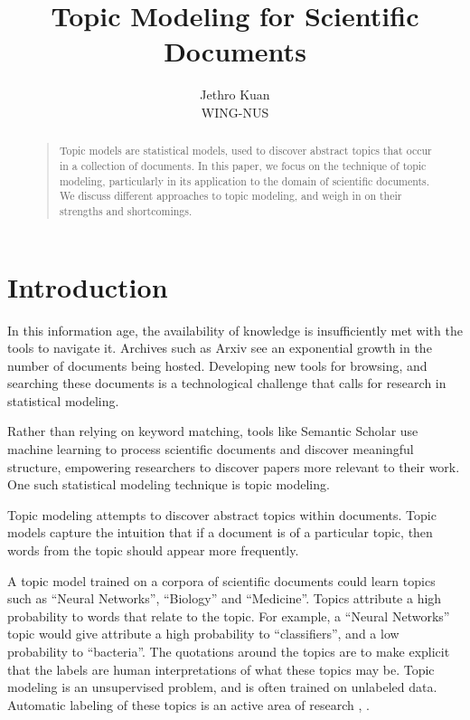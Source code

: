 \documentclass[letterpaper]{article}
\begin{document}
\nocopyright

\title{Topic Modeling for Scientific Documents}
\author{Jethro Kuan \\
  WING-NUS\\
}
\maketitle
\begin{abstract}
  \begin{quote}
    Topic models are statistical models, used to discover abstract
    topics that occur in a collection of documents. In this paper, we
    focus on the technique of topic modeling, particularly in its
    application to the domain of scientific documents. We discuss
    different approaches to topic modeling, and weigh in on their
    strengths and shortcomings.
  \end{quote}
\end{abstract}

\section{Introduction}
In this information age, the availability of knowledge is
insufficiently met with the tools to navigate it. Archives such as
Arxiv see an exponential growth in the number of documents being
hosted. Developing new tools for browsing, and searching these
documents is a technological challenge that calls for research in
statistical modeling.

Rather than relying on keyword matching, tools like Semantic Scholar
use machine learning to process scientific documents and discover
meaningful structure, empowering researchers to discover papers more
relevant to their work. One such statistical modeling technique is
topic modeling.

Topic modeling attempts to discover abstract topics within documents.
Topic models capture the intuition that if a document is of a
particular topic, then words from the topic should appear more
frequently.

A topic model trained on a corpora of scientific documents could learn
topics such as ``Neural Networks'', ``Biology'' and ``Medicine''.
Topics attribute a high probability to words that relate to the topic.
For example, a ``Neural Networks'' topic would give attribute a high
probability to ``classifiers'', and a low probability to ``bacteria''.
The quotations around the topics are to make explicit that the labels
are human interpretations of what these topics may be. Topic modeling
is an unsupervised problem, and is often trained on unlabeled data.
Automatic labeling of these topics is an active area of research
\cite{mei2007automatic}, \cite{lau2011automatic}.
\end{document}
